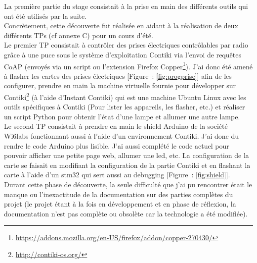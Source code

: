 \documentclass{article}
\begin{document}
La première partie du stage consistait à la prise en main des différents outils qui ont été utilisés par la suite.\\
Concrètement, cette découverte fut réalisée en aidant à la réalisation de deux différents TPs (cf annexe C) pour un cours d'été.\\
Le premier TP consistait à contrôler des prises électriques contrôlables par radio grâce à une puce sous le système d'exploitation Contiki via l'envoi de requêtes CoAP (envoyés via un script ou l'extension Firefox Copper\footnote{\url{https://addons.mozilla.org/en-US/firefox/addon/copper-270430/}}). J'ai donc été amené à flasher les cartes des prises électriques [Figure~: \ref{fig:progprise}] afin de les configurer, prendre en main la machine virtuelle fournie pour développer sur Contiki\footnote{\url{http://contiki-os.org/}} (à l'aide d'Instant Contiki) qui est une machine Ubuntu Linux avec les outils spécifiques à Contiki (Pour lister les appareils, les flasher, etc.) et réaliser un script Python pour obtenir l'état d'une lampe et allumer une autre lampe.\\
Le second TP consistait à prendre en main le shield Arduino de la société Wi6labs fonctionnant aussi à l'aide d'un environnement Contiki. J'ai donc du rendre le code Arduino plus lisible. J'ai aussi complété le code actuel pour pouvoir afficher une petite page web, allumer une led, etc. La configuration de la carte se faisait en modifiant la configuration de la partie Contiki et en flashant la carte à l'aide d'un stm32 qui sert aussi au debugging [Figure~: \ref{fig:shield}].\\
Durant cette phase de découverte, la seule difficulté que j'ai pu rencontrer était le manque ou l'inexactitude de la documentation sur des parties complètes du projet (le projet étant à la fois en développement et en phase de réflexion, la documentation n'est pas complète ou obsolète car la technologie a été modifiée).\\
\end{document}
